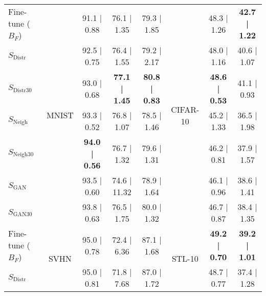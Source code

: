 \begin{table}[t]
\begin{minipage}[t]{0.98\textwidth}
{\begin{tabular}{lccccccc}
\cmidrule(r){1-1} \cmidrule(rl){2-2}  \cmidrule(rl){3-5} \cmidrule(rl){6-6} \cmidrule(l){7-8}
Fine-tune ($B_F$)       & \multirow{7}{*}{MNIST}    & 91.1 | 0.88               & 76.1 | 1.35              & 79.3 | 1.85                & \multirow{7}{*}{CIFAR-10} &  48.3 | 1.26                  & \textbf{42.7 | 1.22} \\  
$S_{\text{Distr}}$     &                           & 92.5 | 0.75               & 76.4 | 1.55              & 79.2 | 2.17                &                            & 48.0 | 1.16                  &         40.6 | 1.07 \\
$S_{\text{Distr}30}$   &                           & 93.0 | 0.68               & \textbf{77.1 | 1.45}     & \textbf{80.8 | 0.83}       &                            & \textbf{48.6 | 0.53 }        &         41.1 | 0.93 \\
$S_{\text{Neigh}}$     &                           & 93.3 | 0.52               & 76.8 | 1.07              & 78.5 | 1.46                &                           &  45.2 | 1.33                  &         36.5 | 1.98 \\
$S_{\text{Neigh}30}$   &                           & \textbf{94.0 | 0.56}      & 76.7 | 1.32              & 79.6 | 1.31                &                           &   46.2 | 0.81                 &         37.9 | 1.57 \\ 
$S_{\text{GAN}}$     &                           & 93.5 | 0.60               & 74.6 | 11.32             & 78.9 | 1.64                &                           & 46.1 | 0.96                   &         38.6 | 1.41 \\
$S_{\text{GAN}30}$   &                           & 93.8 | 0.63               & 76.5 | 1.75              & 80.0 | 1.32                &                           & 46.7 | 0.87                   &         38.4 | 1.35 \\
\cmidrule(r){1-1} \cmidrule(rl){2-2}  \cmidrule(rl){3-5} \cmidrule(rl){6-6} \cmidrule(l){7-8}
Fine-tune ($B_F$)       & \multirow{7}{*}{SVHN}     & 95.0 | 0.78               & 72.4 | 6.36              & 87.1 | 1.68                & \multirow{7}{*}{STL-10}    & \textbf{49.2 | 0.70 	}       & \textbf{39.2 | 1.01}   \\  
$S_{\text{Distr}}$     &                           & 95.0 | 0.81               & 71.8 | 7.68              & 87.0 | 1.72                &                             & 48.7 | 0.77                 & 37.4 | 1.28 	   \\ 

\end{tabular}}
\end{minipage}
\end{table}
